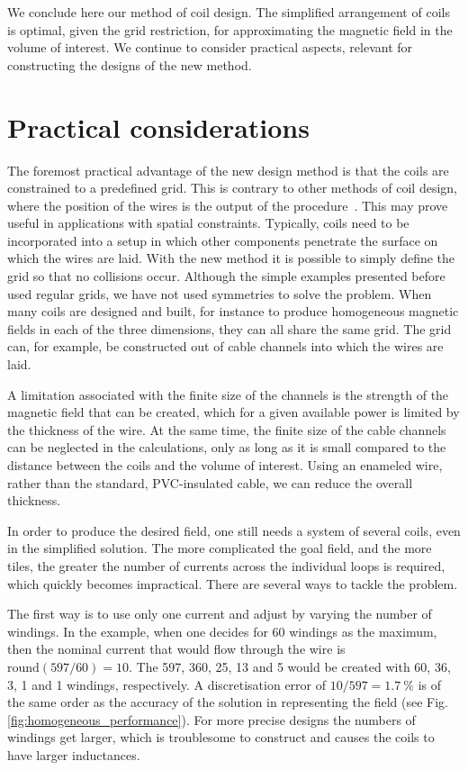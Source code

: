 We conclude here our method of coil design.
The simplified arrangement of coils is optimal, given the grid restriction, for approximating the magnetic field in the volume of interest.
We continue to consider practical aspects, relevant for constructing the designs of the new method.




\section{Practical considerations}
The foremost practical advantage of the new design method is that the coils are constrained to a predefined grid.
This is contrary to other methods of coil design, where the position of the wires is the output of the procedure~\cite{Turner1993, Beidler1990}. This may prove useful in applications with spatial constraints.
Typically, coils need to be incorporated into a setup in which other components penetrate the surface on which the wires are laid.
With the new method it is possible to simply define the grid so that no collisions occur.
Although the simple examples presented before used regular grids, we have not used symmetries to solve the problem.
When many coils are designed and built, for instance to produce homogeneous magnetic fields in each of the three dimensions, they can all share the same grid.
The grid can, for example, be constructed out of cable channels into which the wires are laid.

A limitation associated with the finite size of the channels is the strength of the magnetic field that can be created, which for a given available power is limited by the thickness of the wire.
At the same time, the finite size of the cable channels can be neglected in the calculations, only as long as it is small compared to the distance between the coils and the volume of interest.
Using an enameled wire, rather than the standard, PVC-insulated cable, we can reduce the overall thickness.

In order to produce the desired field, one still needs a system of several coils, even in the simplified solution.
The more complicated the goal field, and the more tiles, the greater the number of currents across the individual loops is required, which quickly becomes impractical.
There are several ways to tackle the problem.

The first way is to use only one current and adjust by varying the number of windings. In the example, when one decides for \num{60} windings as the maximum, then the nominal current that would flow through the wire is $\mathrm{round}(597 / 60) = 10$. The \num{597}, \num{360}, \num{25}, \num{13} and \num{5} would be created with \num{60}, \num{36}, \num{3}, \num{1} and \num{1} windings, respectively. A discretisation error of $10 / 597 = \SI{1.7}{\percent}$ is of the same order as the accuracy of the solution in representing the field (see Fig.\,\ref{fig:homogeneous_performance}). For more precise designs the numbers of windings get larger, which is troublesome to construct and causes the coils to have larger inductances.

